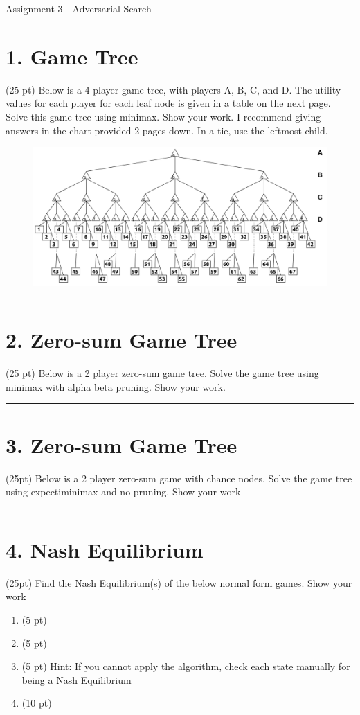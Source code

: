 \documentclass[11pt]{article}
\begin{document}
\begin{flushleft}
Assignment 3 - Adversarial Search

\section*{1. Game Tree}
(25 pt) Below is a 4 player game tree, with players A, B, C, and D. The utility
    values for each player for each leaf node is given in a table on the next
    page. Solve this game tree using minimax. Show your work. I recommend
    giving answers in the chart provided 2 pages down. In a tie, use the
    leftmost child.

\begin{figure}[h]
    \begin{center}
        \includegraphics[width=\textwidth]{Images/game_tree.png}
        \label{fig:game_tree}
    \end{center}
\end{figure}

\rule{\textwidth}{0.5pt}

\section*{2. Zero-sum Game Tree}
(25 pt) Below is a 2 player zero-sum game tree. Solve the game tree using
    minimax with alpha beta pruning. Show your work.

\rule{\textwidth}{0.5pt}

\section*{3. Zero-sum Game Tree}
(25pt) Below is a 2 player zero-sum game with chance nodes. Solve the game tree
    using expectiminimax and no pruning. Show your work

\rule{\textwidth}{0.5pt}

\section*{4. Nash Equilibrium}
(25pt) Find the Nash Equilibrium(s) of the below normal form games. Show your
    work

\begin{enumerate}[label=\alph*.]
    \item (5 pt)
    \item (5 pt)
    \item (5 pt) Hint: If you cannot apply the algorithm, check each state
        manually for being a Nash Equilibrium
    \item (10 pt)
\end{enumerate}

\end{flushleft}
\end{document}
